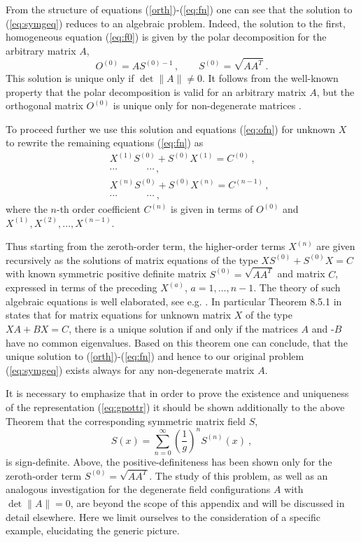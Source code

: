 \documentclass[a4paper,12pt]{article}
\newcommand{\nn}{\nonumber}
\begin{document}
From the structure of equations (\ref{orth})-(\ref{eq:fn}) one can see that the
solution to (\ref{eq:symgeq}) reduces to an algebraic problem.
Indeed, the solution to the first, homogeneous equation (\ref{eq:f0})
is given by the polar decomposition for the arbitrary matrix $A$,
\begin{equation}
\label{eq:f0s}
O^{(0)}= A S^{(0)-1 }\,, \quad\quad S^{(0)}=\sqrt{A A^T}~.
\end{equation}
This solution is unique only if $\det \|A\| \neq 0$.
It follows from the well-known property that the polar decomposition is valid
for an arbitrary matrix $A$, but the orthogonal matrix $O^{(0)}$
is unique only for non-degenerate matrices \cite{Gantmacher}.

To proceed further we use this solution and equations
(\ref{eq:ofn}) for unknown $X$ to rewrite the remaining equations
(\ref{eq:fn}) as
\begin{eqnarray}
&& {X^{(1)}}S^{(0)} + S^{(0)} {X^{(1)}}   = C^{(0)}\,, \nn\\
&& \cdots  \quad\qquad  \cdots \,, \nn \\
&& {X^{(n)}}S^{(0)} + S^{(0)} {X^{(n)}} = C^{(n-1)}\,, \nn \\
&& \cdots  \quad \qquad \cdots~,
\label{eq:fn2}
\end{eqnarray}
where the $n$-th  order coefficient  $C^{(n)}$ is given in terms of
$O^{(0)}$ and $X^{(1)}, X^{(2)},\dots,  X^{(n-1)} $.

Thus starting from the zeroth-order term, the higher-order
terms $X^{(n)}$ are given recursively as the solutions
of matrix equations of the type $X S^{(0)}+ S^{(0)} X = C$ with known
symmetric positive definite matrix
$S^{(0)} =\sqrt{A A^T}$ and matrix $C$, expressed in terms of
the preceding  $X^{(a)}$, $ a=1, \dots ,n-1 $.
The theory of such algebraic equations is well
elaborated, see e.g. \cite{Lancaster,Gantmacher}.
In particular Theorem 8.5.1 in \cite{Lancaster}
states that for matrix equations for unknown matrix $X$ of the type
$XA + BX = C$, there is a unique solution
if and only if  the matrices
$A$ and -$B$ have no common eigenvalues.
Based on this theorem one can conclude, that the unique  solution
to (\ref{orth})-(\ref{eq:fn}) and hence to our original problem
(\ref{eq:symgeq}) exists always for any non-degenerate matrix $A$.

It is necessary to emphasize that in order to prove
the existence and uniqueness of the representation (\ref{eq:gpottr})
it should be shown additionally to the above {\sf Theorem} that the
corresponding symmetric matrix field $S$,
\begin{equation}\label{eq:sex}
S(x) = \sum_{n=0}^{\infty}
\left(\frac{1}{g}\right)^n S^{(n)}(x)~,
\end{equation}
is sign-definite. Above, the positive-definiteness has been shown
only for the zeroth-order term $S^{(0)}=\sqrt{A A^T}$.
The study of this problem,
as well as an analogous investigation for the degenerate field configurations $A$
with $\det \|A \|= 0$, are
beyond the scope of this appendix and will be discussed in detail elsewhere.
Here we limit ourselves to the consideration of a specific example,
elucidating the generic picture.
\end{document}
